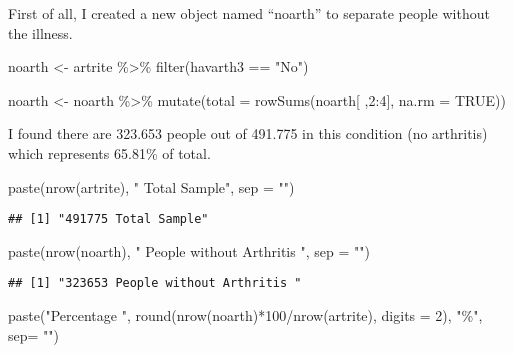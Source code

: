 \documentclass[
]{article}
\newenvironment{Shaded}{\begin{snugshade}}{\end{snugshade}}
\newcommand{\AttributeTok}[1]{\textcolor[rgb]{0.77,0.63,0.00}{#1}}
\newcommand{\ConstantTok}[1]{\textcolor[rgb]{0.00,0.00,0.00}{#1}}
\newcommand{\DecValTok}[1]{\textcolor[rgb]{0.00,0.00,0.81}{#1}}
\newcommand{\FunctionTok}[1]{\textcolor[rgb]{0.00,0.00,0.00}{#1}}
\newcommand{\NormalTok}[1]{#1}
\newcommand{\OtherTok}[1]{\textcolor[rgb]{0.56,0.35,0.01}{#1}}
\newcommand{\SpecialCharTok}[1]{\textcolor[rgb]{0.00,0.00,0.00}{#1}}
\newcommand{\StringTok}[1]{\textcolor[rgb]{0.31,0.60,0.02}{#1}}
\begin{document}
First of all, I created a new object named ``noarth'' to separate people
without the illness.

\begin{Shaded}
\begin{Highlighting}[]
\NormalTok{noarth }\OtherTok{\textless{}{-}}\NormalTok{ artrite }\SpecialCharTok{\%\textgreater{}\%} 
  \FunctionTok{filter}\NormalTok{(havarth3 }\SpecialCharTok{==} \StringTok{"No"}\NormalTok{)}

\NormalTok{noarth }\OtherTok{\textless{}{-}}\NormalTok{ noarth }\SpecialCharTok{\%\textgreater{}\%} \FunctionTok{mutate}\NormalTok{(}\AttributeTok{total =} \FunctionTok{rowSums}\NormalTok{(noarth[ ,}\DecValTok{2}\SpecialCharTok{:}\DecValTok{4}\NormalTok{], }\AttributeTok{na.rm =} \ConstantTok{TRUE}\NormalTok{))}
\end{Highlighting}
\end{Shaded}

I found there are 323.653 people out of 491.775 in this condition (no
arthritis) which represents 65.81\% of total.

\begin{Shaded}
\begin{Highlighting}[]
\FunctionTok{paste}\NormalTok{(}\FunctionTok{nrow}\NormalTok{(artrite), }\StringTok{" Total Sample"}\NormalTok{, }\AttributeTok{sep =} \StringTok{""}\NormalTok{)}
\end{Highlighting}
\end{Shaded}

\begin{verbatim}
## [1] "491775 Total Sample"
\end{verbatim}

\begin{Shaded}
\begin{Highlighting}[]
\FunctionTok{paste}\NormalTok{(}\FunctionTok{nrow}\NormalTok{(noarth), }\StringTok{" People without Arthritis "}\NormalTok{, }\AttributeTok{sep =} \StringTok{""}\NormalTok{)}
\end{Highlighting}
\end{Shaded}

\begin{verbatim}
## [1] "323653 People without Arthritis "
\end{verbatim}

\begin{Shaded}
\begin{Highlighting}[]
\FunctionTok{paste}\NormalTok{(}\StringTok{"Percentage "}\NormalTok{, }\FunctionTok{round}\NormalTok{(}\FunctionTok{nrow}\NormalTok{(noarth)}\SpecialCharTok{*}\DecValTok{100}\SpecialCharTok{/}\FunctionTok{nrow}\NormalTok{(artrite), }\AttributeTok{digits =} \DecValTok{2}\NormalTok{), }\StringTok{"\%"}\NormalTok{, }\AttributeTok{sep=} \StringTok{""}\NormalTok{)}
\end{Highlighting}
\end{Shaded}
\end{document}
